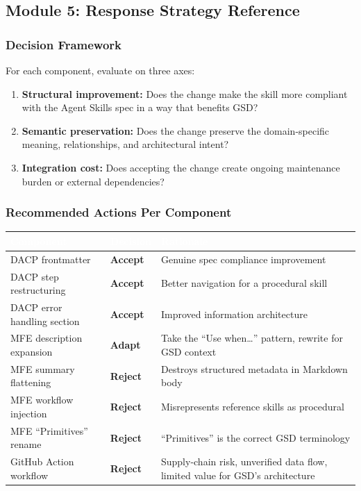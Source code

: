 \documentclass[11pt,letterpaper]{article}
\newcommand{\tableheader}[1]{\textbf{\sffamily\textcolor{white}{#1}}}
\begin{document}
\subsection{Module 5: Response Strategy Reference}

\subsubsection{Decision Framework}

For each component, evaluate on three axes:

\begin{enumerate}[leftmargin=2em]
\item \textbf{Structural improvement:} Does the change make the skill more compliant with the Agent Skills spec in a way that benefits GSD?
\item \textbf{Semantic preservation:} Does the change preserve the domain-specific meaning, relationships, and architectural intent?
\item \textbf{Integration cost:} Does accepting the change create ongoing maintenance burden or external dependencies?
\end{enumerate}

\subsubsection{Recommended Actions Per Component}

\begin{center}
\begin{tabularx}{\textwidth}{L{3.5cm}L{2cm}X}
\toprule
{}
\tableheader{Component} & \tableheader{Decision} & \tableheader{Rationale} \\
\midrule
DACP frontmatter & \textbf{Accept} & Genuine spec compliance improvement \\
DACP step restructuring & \textbf{Accept} & Better navigation for a procedural skill \\
DACP error handling section & \textbf{Accept} & Improved information architecture \\
MFE description expansion & \textbf{Adapt} & Take the ``Use when\ldots'' pattern, rewrite for GSD context \\
MFE summary flattening & \textbf{Reject} & Destroys structured metadata in Markdown body \\
MFE workflow injection & \textbf{Reject} & Misrepresents reference skills as procedural \\
MFE ``Primitives'' rename & \textbf{Reject} & ``Primitives'' is the correct GSD terminology \\
GitHub Action workflow & \textbf{Reject} & Supply-chain risk, unverified data flow, limited value for GSD's architecture \\
\bottomrule
\end{tabularx}
\end{center}
\end{document}
